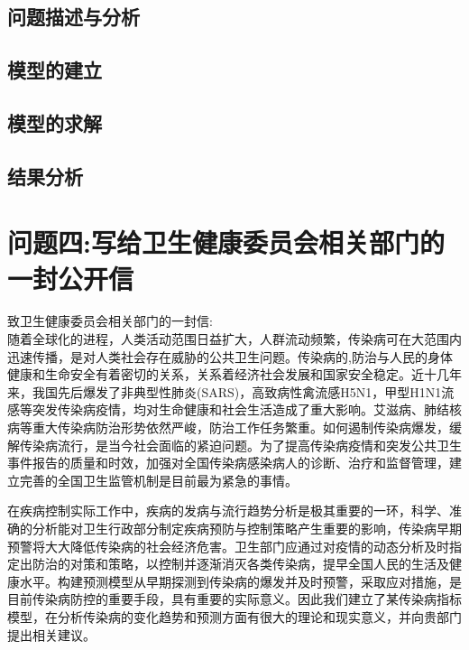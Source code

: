\documentclass{whutmod}
\begin{document}
     \subsection{问题描述与分析}
    
     
     
     \subsection{模型的建立}
     
     
     
     
     \subsection{模型的求解}   
     
     
     \subsection{结果分析}
     
     
    \section{问题四:写给卫生健康委员会相关部门的一封公开信}
    致卫生健康委员会相关部门的一封信:
    ~\\
    
    随着全球化的进程，人类活动范围日益扩大，人群流动频繁，传染病可在大范围内迅速传播，是对人类社会存在威胁的公共卫生问题。传染病的,防治与人民的身体健康和生命安全有着密切的关系，关系着经济社会发展和国家安全稳定。近十几年来，我国先后爆发了非典型性肺炎(SARS)，高致病性禽流感H5N1，甲型H1N1流感等突发传染病疫情，均对生命健康和社会生活造成了重大影响。艾滋病、肺结核病等重大传染病防治形势依然严峻，防治工作任务繁重。如何遏制传染病爆发，缓解传染病流行，是当今社会面临的紧迫问题。为了提高传染病疫情和突发公共卫生事件报告的质量和时效，加强对全国传染病感染病人的诊断、治疗和监督管理，建立完善的全国卫生监管机制是目前最为紧急的事情。
    
    在疾病控制实际工作中，疾病的发病与流行趋势分析是极其重要的一环，科学、准确的分析能对卫生行政部分制定疾病预防与控制策略产生重要的影响，传染病早期预警将大大降低传染病的社会经济危害。卫生部门应通过对疫情的动态分析及时指定出防治的对策和策略，以控制并逐渐消灭各类传染病，提早全国人民的生活及健康水平。构建预测模型从早期探测到传染病的爆发并及时预警，采取应对措施，是目前传染病防控的重要手段，具有重要的实际意义。因此我们建立了某传染病指标模型，在分析传染病的变化趋势和预测方面有很大的理论和现实意义，并向贵部门提出相关建议。
    
\end{document}
